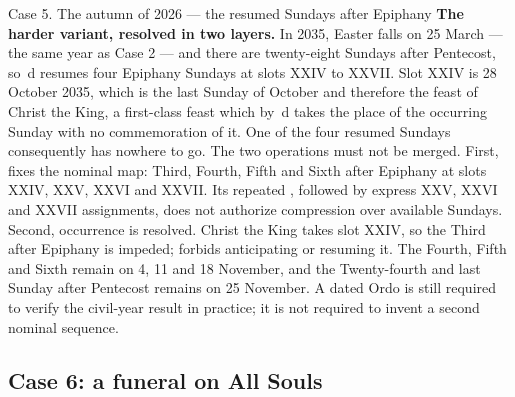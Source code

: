 \begin{casebox}{Case 5. The autumn of 2026 --- the resumed Sundays after
Epiphany}
\textbf{The harder variant, resolved in two layers.} In 2035, Easter falls on 25
March --- the same year as Case 2 --- and there are twenty-eight Sundays after
Pentecost, so \,d resumes four Epiphany Sundays at slots XXIV to XXVII.
Slot XXIV is 28 October 2035, which is the last Sunday of October and therefore
the feast of Christ the King, a first-class feast which by \,d takes the
place of the occurring Sunday with no commemoration of it. One of the four
resumed Sundays consequently has nowhere to go. The two operations must not be
merged. First,  fixes the nominal map: Third, Fourth, Fifth and Sixth
after Epiphany at slots XXIV, XXV, XXVI and XXVII. Its repeated
, followed by express XXV, XXVI and XXVII
assignments, does not authorize compression over available Sundays. Second,
occurrence is resolved. Christ the King takes slot XXIV, so the Third after
Epiphany is impeded;  forbids anticipating or resuming it. The Fourth,
Fifth and Sixth remain on 4, 11 and 18 November, and the Twenty-fourth and last
Sunday after Pentecost remains on 25 November. A dated Ordo is still required
to verify the civil-year result in practice; it is not required to invent a
second nominal sequence.
\end{casebox}

\subsection{Case 6: a funeral on All Souls}

